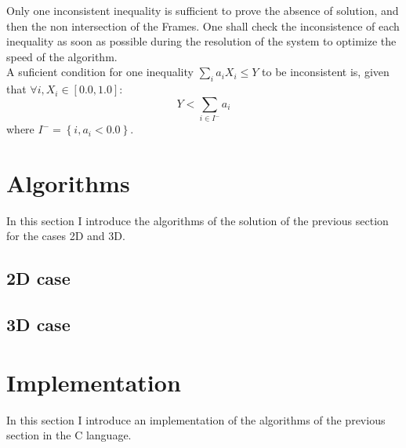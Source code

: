 \documentclass[12pt, a4paper]{article}
\begin{document}
Only one inconsistent inequality is sufficient to prove the absence of solution, and then the non intersection of the Frames. One shall check the inconsistence of each inequality as soon as possible during the resolution of the system to optimize the speed of the algorithm.\\

A suficient condition for one inequality $\sum_ia_iX_i\le Y$ to be inconsistent is, given that $\forall i,X_i\in[0.0,1.0]$:
\begin{equation}
Y<\sum_{i\in I^-}a_i
\end{equation}
where $I^-=\left\lbrace i, a_i<0.0\right\rbrace$.\\

\section{Algorithms}

In this section I introduce the algorithms of the solution of the previous section for the cases 2D and 3D.\\

\subsection{2D case}

\begin{scriptsize}
\begin{ttfamily}

\end{ttfamily}
\end{scriptsize}

\subsection{3D case}

\begin{scriptsize}
\begin{ttfamily}

\end{ttfamily}
\end{scriptsize}

\section{Implementation}

In this section I introduce an implementation of the algorithms of the previous section in the C language.\\
\end{document}
